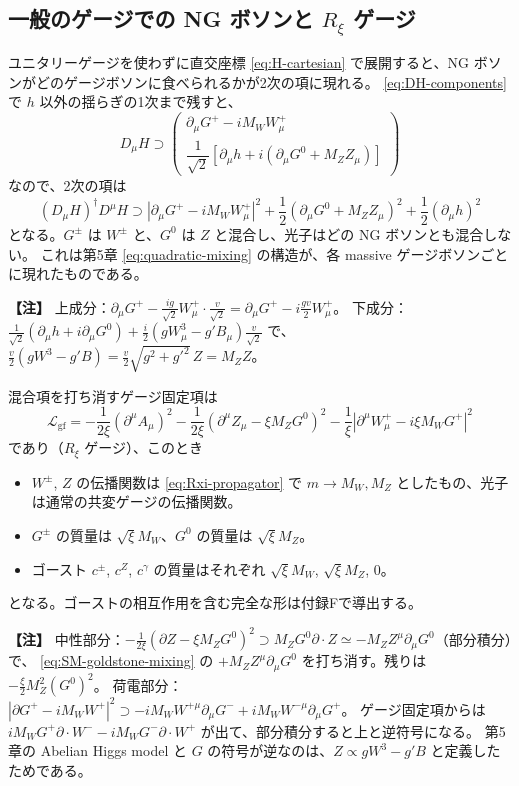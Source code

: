 \documentclass[uplatex,dvipdfmx,a4paper,11pt,openany]{jsbook}
\newenvironment{note}{\vspace{1ex}\par\footnotesize\noindent\textbf{【注】}}{\par\vspace{1ex}}
\numberwithin{equation}{chapter}
\theoremstyle{definition}
\theoremstyle{plain}
\theoremstyle{remark}
\newcommand{\Lag}{\mathcal{L}}
\begin{document}
\subsection{一般のゲージでの NG ボソンと $R_\xi$ ゲージ}
ユニタリーゲージを使わずに直交座標 \eqref{eq:H-cartesian} で展開すると、NG ボソンがどのゲージボソンに食べられるかが2次の項に現れる。
\eqref{eq:DH-components} で $h$ 以外の揺らぎの1次まで残すと、
\begin{equation}
D_\mu H\supset\begin{pmatrix}\partial_\mu G^+-iM_WW^+_\mu\\ \dfrac{1}{\sqrt2}\left[\partial_\mu h+i\left(\partial_\mu G^0+M_ZZ_\mu\right)\right]\end{pmatrix}
\end{equation}
なので、2次の項は
\begin{equation}
(D_\mu H)^\dagger D^\mu H\supset
\left|\partial_\mu G^+-iM_WW^+_\mu\right|^2+\frac12\left(\partial_\mu G^0+M_ZZ_\mu\right)^2+\frac12(\partial_\mu h)^2
\label{eq:SM-goldstone-mixing}
\end{equation}
となる。$G^\pm$ は $W^\pm$ と、$G^0$ は $Z$ と混合し、光子はどの NG ボソンとも混合しない。
これは第5章 \eqref{eq:quadratic-mixing} の構造が、各 massive ゲージボソンごとに現れたものである。
\begin{note}
上成分：$\partial_\mu G^+-\frac{ig}{\sqrt2}W^+_\mu\cdot\frac{v}{\sqrt2}=\partial_\mu G^+-i\frac{gv}{2}W^+_\mu$。
下成分：$\frac{1}{\sqrt2}(\partial_\mu h+i\partial_\mu G^0)+\frac i2(gW^3_\mu-g'B_\mu)\frac{v}{\sqrt2}$ で、
$\frac v2(gW^3-g'B)=\frac v2\sqrt{g^2+g'^2}\,Z=M_ZZ$。
\end{note}
混合項を打ち消すゲージ固定項は
\begin{equation}
\Lag_{\mathrm{gf}}=-\frac{1}{2\xi}\left(\partial^\mu A_\mu\right)^2
-\frac{1}{2\xi}\left(\partial^\mu Z_\mu-\xi M_ZG^0\right)^2
-\frac1\xi\left|\partial^\mu W^+_\mu-i\xi M_WG^+\right|^2
\label{eq:SM-Rxi}
\end{equation}
であり（$R_\xi$ ゲージ）、このとき
\begin{itemize}
    \item $W^\pm$, $Z$ の伝播関数は \eqref{eq:Rxi-propagator} で $m\to M_W,M_Z$ としたもの、光子は通常の共変ゲージの伝播関数。
    \item $G^\pm$ の質量は $\sqrt\xi M_W$、$G^0$ の質量は $\sqrt\xi M_Z$。
    \item ゴースト $c^\pm$, $c^Z$, $c^\gamma$ の質量はそれぞれ $\sqrt\xi M_W$, $\sqrt\xi M_Z$, $0$。
\end{itemize}
となる。ゴーストの相互作用を含む完全な形は付録Fで導出する。
\begin{note}
中性部分：$-\frac{1}{2\xi}(\partial Z-\xi M_ZG^0)^2\supset M_ZG^0\partial\cdot Z\simeq-M_ZZ^\mu\partial_\mu G^0$（部分積分）で、
\eqref{eq:SM-goldstone-mixing} の $+M_ZZ^\mu\partial_\mu G^0$ を打ち消す。残りは $-\frac\xi2M_Z^2(G^0)^2$。
荷電部分：$|\partial G^+-iM_WW^+|^2\supset-iM_WW^{+\mu}\partial_\mu G^-+iM_WW^{-\mu}\partial_\mu G^+$。
ゲージ固定項からは $iM_WG^+\partial\cdot W^--iM_WG^-\partial\cdot W^+$ が出て、部分積分すると上と逆符号になる。
第5章の Abelian Higgs model と $G$ の符号が逆なのは、$Z\propto gW^3-g'B$ と定義したためである。
\end{note}
\end{document}
